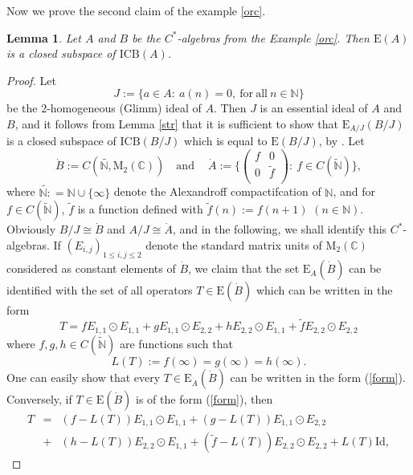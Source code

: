 \documentclass[]{amsart}
\newtheorem{lemma}[theorem]{Lemma}
\theoremstyle{remark}
\theoremstyle{definition}
\theoremstyle{question}
\numberwithin{equation}{section}
\begin{document}
Now we prove the second claim of the example \ref{orc}.

\begin{lemma} Let $A$ and $B$ be the $C^*$-algebras from the Example \ref{orc}. Then
${\mathrm{E}}(A)$ is a closed subspace of $\mathrm{ICB}(A)$.
\end{lemma}
\begin{proof}  Let
 $$J:=\{a \in A : \ a(n)=0, \ \mathrm{for} \ \mathrm{all} \  n \in {\mathbb{N}}\}$$ be the
$2$-homogeneous (Glimm) ideal of $A$.
 Then $J$ is an essential ideal of $A$ and $B$, and it follows from Lemma
\ref{str} that it is sufficient to show that ${\mathrm{E}}_{A/J}(B/J)$ is a closed
subspace of $\mathrm{ICB}(B/J)$ which is equal to ${\mathrm{E}}(B/J)$, by \cite[1.1]{Mag}.
Let
$$\dot{B}:= C(\tilde{{\mathbb{N}},} {\mathrm{M}}_2({\mathbb{C}})) \quad \mathrm{and} \quad \ \dot{A}:=\Big\{\left( \begin{array}{cc}
               f & 0 \\
              0 & \tilde{f}\\
               \end{array} \right): \ f \in C(\tilde{\mathbb{N}})\Big\},$$
where $\tilde{{\mathbb{N}}:}={\mathbb{N}} \cup \{\infty\}$ denote the Alexandroff compactifcation of
${\mathbb{N}}$, and for $f \in C(\tilde{\mathbb{N}})$, $\tilde{f}$ is a function defined with
$\tilde{f}(n):=f(n+1)$ $(n \in {\mathbb{N}})$. Obviously $B/J \cong \dot{B}$ and $A/J
\cong \dot{A}$, and in the following, we shall identify this $C^*$-algebras. If
$(E_{i,j})_{1\leq i,j\leq 2}$ denote the standard matrix units of ${\mathrm{M}}_2({\mathbb{C}})$ considered as constant elements of $\dot{B}$, we
claim that the set ${\mathrm{E}}_{\dot{A}}(\dot{B})$
can be identified with the set of all operators $T \in {\mathrm{E}}(\dot{B})$ which can be
written in the form
\begin{equation}\label{form}
T =f E_{1,1} \odot E_{1,1} + g E_{1,1} \odot E_{2,2}+ h E_{2,2} \odot E_{1,1} +
\tilde{f} E_{2,2} \odot E_{2,2}
\end{equation}
 where $f,g,h\in C(\tilde{\mathbb{N}})$ are functions such that
$$L(T):=f(\infty)=g(\infty)=h(\infty).$$ One can easily show that every $T \in
{\mathrm{E}}_{\dot{A}}(\dot{B})$ can be written in the form (\ref{form}). Conversely, if
$T\in {\mathrm{E}}(\dot{B})$ is of the form  (\ref{form}), then
\begin{eqnarray*}
T &=& (f-L(T)) E_{1,1} \odot E_{1,1} + (g -L(T))E_{1,1} \odot E_{2,2} \\
 &+&(h-L(T))
E_{2,2} \odot E_{1,1} + (\tilde{f}-L(T)) E_{2,2} \odot E_{2,2} +L(T)\mathrm{Id},
\end{eqnarray*}


\end{proof}
\end{document}
